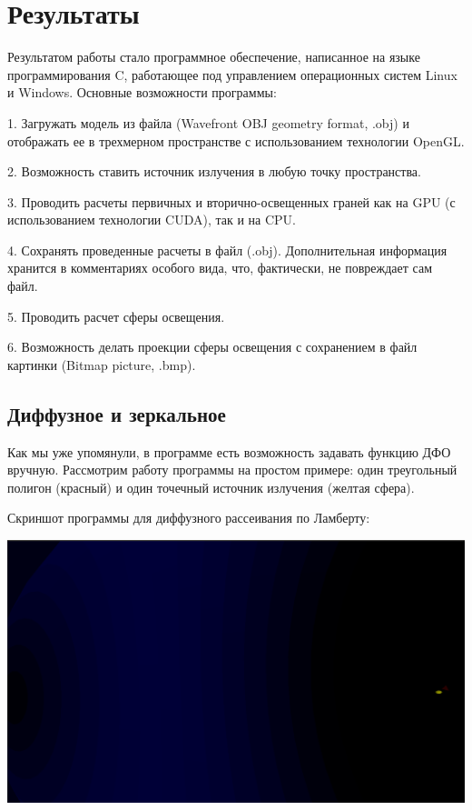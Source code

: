 \newpage
\section*{Результаты} 

Результатом работы стало программное обеспечение, написанное на языке программирования C, работающее под управлением операционных систем Linux и Windows. Основные возможности программы:

1. Загружать модель из файла (Wavefront OBJ geometry format, .obj) и отображать ее в трехмерном пространстве с использованием технологии OpenGL.

2. Возможность ставить источник излучения в любую точку пространства.

3. Проводить расчеты первичных и вторично-освещенных граней как на GPU (с использованием технологии CUDA), так и на CPU.

4. Сохранять проведенные расчеты в файл (.obj). Дополнительная информация хранится в комментариях особого вида, что, фактически, не повреждает сам файл.

5. Проводить расчет сферы освещения.

6. Возможность делать проекции сферы освещения с сохранением в файл картинки (Bitmap picture, .bmp).

\subsection*{Диффузное и зеркальное}

Как мы уже упомянули, в программе есть возможность задавать функцию ДФО вручную. Рассмотрим работу программы на простом примере: один треугольный полигон (красный) и один точечный источник излучения (желтая сфера). 

Скриншот программы для диффузного рассеивания по Ламберту:

\includegraphics[width=1\linewidth]{lambert-screen.png}

